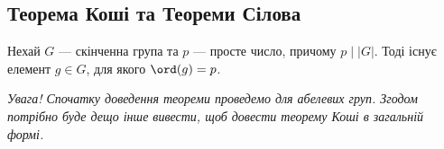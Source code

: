 \documentclass{math_library}
\begin{document}

\subsection{Теорема Коші та Теореми Сілова}
\begin{theorem}
Нехай $G$ --- скінченна група та $p$ --- просте число, причому $p \mid |G|$. Тоді існує елемент $g \in G$, для якого $\ord(g) = p$.
\end{theorem}

\textit{Увага! Спочатку доведення теореми проведемо для абелевих груп. Згодом потрібно буде дещо інше вивести, щоб довести теорему Коші в загальній формі.}
\end{document}
